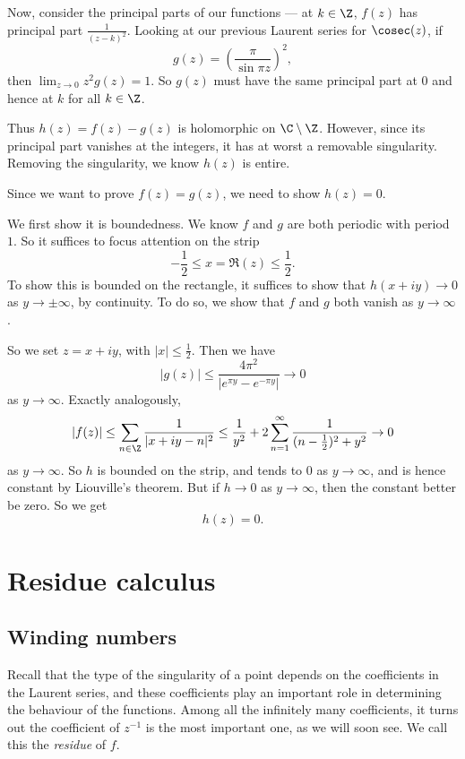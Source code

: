 \documentclass[a4paper]{article}
\begin{document}
\begin{eg}
  Now, consider the principal parts of our functions --- at $k \in \Z$, $f(z)$ has principal part $\frac{1}{(z - k)^2}$. Looking at our previous Laurent series for $\cosec (z)$, if
  \[
    g(z) = \left(\frac{\pi}{\sin \pi z}\right)^2,
  \]
  then $\lim_{z \to 0} z^2 g(z) = 1$. So $g(z)$ must have the same principal part at $0$ and hence at $k$ for all $k \in \Z$.

  Thus $h(z) = f(z) - g(z)$ is holomorphic on $\C \setminus \Z$. However, since its principal part vanishes at the integers, it has at worst a removable singularity. Removing the singularity, we know $h(z)$ is entire.

  Since we want to prove $f(z) = g(z)$, we need to show $h(z) = 0$.

  We first show it is boundedness. We know $f$ and $g$ are both periodic with period $1$. So it suffices to focus attention on the strip
  \[
    -\frac{1}{2} \leq x = \Re(z) \leq \frac{1}{2}.
  \]
  To show this is bounded on the rectangle, it suffices to show that $h(x + iy) \to 0$ as $y \to \pm\infty$, by continuity. To do so, we show that $f$ and $g$ both vanish as $y \to \infty$.

  So we set $z = x + iy$, with $|x| \leq \frac{1}{2}$. Then we have
  \[
    |g(z)| \leq \frac{4\pi^2}{|e^{\pi y} - e^{- \pi y}|} \to 0
  \]
  as $y \to \infty$. Exactly analogously,
  \[
    |f(z)| \leq \sum_{n \in \Z} \frac{1}{|x + iy - n|^2} \leq \frac{1}{y^2} + 2 \sum_{n = 1}^\infty \frac{1}{(n - \frac{1}{2})^2 + y^2} \to 0
  \]
  as $y \to \infty$. So $h$ is bounded on the strip, and tends to $0$ as $y \to \infty$, and is hence constant by Liouville's theorem. But if $h \to 0$ as $y \to \infty$, then the constant better be zero. So we get
  \[
    h(z) = 0.
  \]
\end{eg}

\section{Residue calculus}
\subsection{Winding numbers}
Recall that the type of the singularity of a point depends on the coefficients in the Laurent series, and these coefficients play an important role in determining the behaviour of the functions. Among all the infinitely many coefficients, it turns out the coefficient of $z^{-1}$ is the most important one, as we will soon see. We call this the \emph{residue} of $f$.
\end{document}
